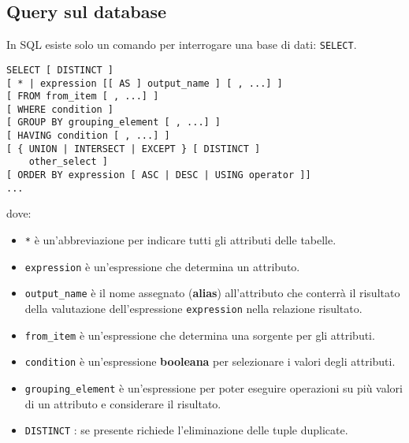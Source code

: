 \documentclass[a4paper, 10pt, titlepage]{article}
\begin{document}
	\subsection{Query sul database}
		In SQL esiste solo un comando per interrogare una base di dati: \lstinline|SELECT|.
		\begin{lstlisting}
SELECT [ DISTINCT ]
[ * | expression [[ AS ] output_name ] [ , ...] ]
[ FROM from_item [ , ...] ]
[ WHERE condition ]
[ GROUP BY grouping_element [ , ...] ]
[ HAVING condition [ , ...] ]
[ { UNION | INTERSECT | EXCEPT } [ DISTINCT ]
	other_select ]
[ ORDER BY expression [ ASC | DESC | USING operator ]]
...
		\end{lstlisting}
		dove:
		\begin{itemize}
			\item \lstinline|*| è un’abbreviazione per indicare tutti gli attributi delle tabelle.
			\item \lstinline|expression| è un’espressione che determina un attributo.
			\item \lstinline|output_name| è il nome assegnato (\textbf{alias}) all’attributo che conterrà il risultato
			della valutazione dell’espressione \lstinline|expression| nella relazione risultato.
			\item \lstinline|from_item| è un’espressione che determina una sorgente per gli attributi.
			\item \lstinline|condition| è un’espressione \textbf{booleana} per selezionare i valori degli
			attributi.
			\item \lstinline|grouping_element| è un’espressione per poter eseguire operazioni su
			più valori di un attributo e considerare il risultato.
			\item \lstinline|DISTINCT| : se presente richiede l’eliminazione delle tuple duplicate.
		\end{itemize}
		
\end{document}
